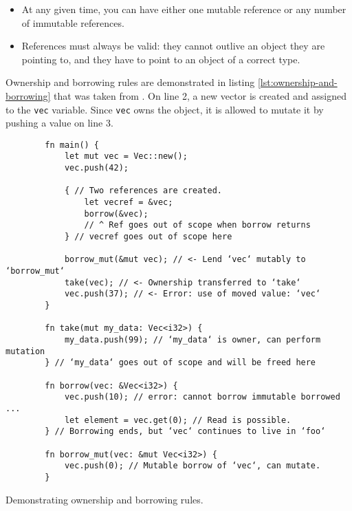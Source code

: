 \begin{itemize}
    \item At any given time, you can have either one mutable reference or any number of immutable references.
    \item References must always be valid: they cannot outlive an object they are pointing to, and they have to point to an object of a correct type.
\end{itemize}

Ownership and borrowing rules are demonstrated in listing \ref{lst:ownership-and-borrowing} that was taken from \cite{linus-parallelization}. On line 2, a new vector is created and assigned to the \texttt{vec} variable. Since \texttt{vec} owns the object, it is allowed to mutate it by pushing a value on line 3.

\begin{listing}[!htbp]

    \centering
    \begin{verbatim}
        fn main() {
            let mut vec = Vec::new();
            vec.push(42);

            { // Two references are created.
                let vecref = &vec;
                borrow(&vec);
                // ^ Ref goes out of scope when borrow returns
            } // vecref goes out of scope here

            borrow_mut(&mut vec); // <- Lend ‘vec‘ mutably to ‘borrow_mut‘
            take(vec); // <- Ownership transferred to ‘take‘
            vec.push(37); // <- Error: use of moved value: ‘vec‘
        }

        fn take(mut my_data: Vec<i32>) {
            my_data.push(99); // ‘my_data‘ is owner, can perform mutation
        } // ‘my_data‘ goes out of scope and will be freed here

        fn borrow(vec: &Vec<i32>) {
            vec.push(10); // error: cannot borrow immutable borrowed ...
            let element = vec.get(0); // Read is possible.
        } // Borrowing ends, but ‘vec‘ continues to live in ‘foo‘

        fn borrow_mut(vec: &mut Vec<i32>) {
            vec.push(0); // Mutable borrow of ‘vec‘, can mutate.
        }
    \end{verbatim}

    \caption{Demonstrating ownership and borrowing rules.}
    \label{lst:ownership-and-borrowing}
\end{listing}

